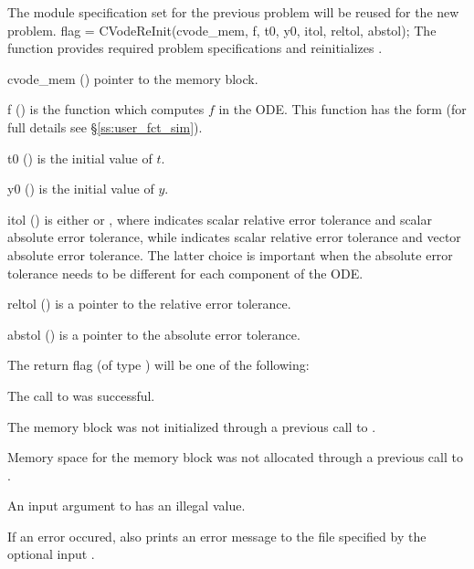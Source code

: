 The {\nvector} module specification  set for the previous problem
will be reused for the new problem.
{
  flag = CVodeReInit(cvode\_mem, f, t0, y0, itol, reltol, abstol);
}
{
  The function  provides required problem specifications 
  and reinitializes {\cvode}.
}
{
  \begin{args}
  \item[cvode\_mem] ()
    pointer to the {\cvode} memory block.
  \item[f] ()
    is the {\C} function which computes $f$ in the ODE. This function has the form 
     (for full details see \S\ref{ss:user_fct_sim}).
  \item[t0] ()
    is the initial value of $t$.
  \item[y0] ()
    is the initial value of $y$. 
  \item[itol] () 
    is either  or , where  indicates scalar relative error 
    tolerance and scalar absolute error tolerance, while  indicates scalar
    relative error tolerance and vector absolute error tolerance. 
    The latter choice is important when the absolute error tolerance needs to
    be different for each component of the ODE. 
  \item[reltol] ()
    is a pointer to the relative error tolerance.
  \item[abstol] ()
    is a pointer to the absolute error tolerance.
  \end{args}
}
{
  The return flag  (of type ) will be one of the following:
  \begin{args}
  \item[\Id{SUCCESS}]
    The call to  was successful.
  \item[\Id{CVREI\_NO\_MEM}] 
    The {\cvode} memory block was not initialized through a 
    previous call to .
  \item[\Id{CVREI\_NO\_MALLOC}] 
    Memory space for the {\cvode} memory block was not allocated through a 
    previous call to .
  \item[\Id{CVREI\_ILL\_INPUT}] 
    An input argument to  has an illegal value.
  \end{args}
}
{
  If an error occured,  also prints an error message to the
  file specified by the optional input .
}
